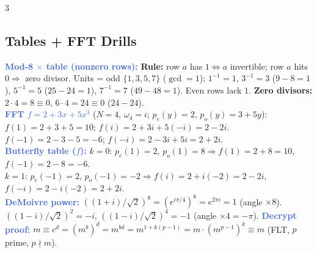 \documentclass[9pt]{extarticle}
\newcommand{\hl}[1]{\textbf{\textcolor{BrickRed}{#1}}}
\newcommand{\ex}[1]{\textbf{\textcolor{RoyalBlue}{#1}}}
\begin{document}
\begin{multicols}{3}
\subsection{Tables + FFT Drills}
\begin{sloppypar}\raggedright
\ex{Mod-8 ${\times}$ table (nonzero rows):} \hl{Rule:} row $a$ has $1\iff a$ invertible; row $a$ hits $0\Rightarrow$ zero divisor. Units = odd $\{1,3,5,7\}$ ($\gcd{=}1$); $1^{-1}{=}1$, $3^{-1}{=}3$ ($9{-}8{=}1$), $5^{-1}{=}5$ ($25{-}24{=}1$), $7^{-1}{=}7$ ($49{-}48{=}1$). Even rows lack $1$. \hl{Zero divisors:} $2{\cdot}4{=}8\equiv0$, $6{\cdot}4{=}24\equiv0$ ($24{-}24$).\\
\ex{FFT $f{=}2{+}3x{+}5x^3$} ($N{=}4$, $\omega_4{=}i$; $p_e(y){=}2$, $p_o(y){=}3{+}5y$):\\
$f(1){=}2{+}3{+}5{=}10$; $f(i){=}2{+}3i{+}5({-}i){=}2{-}2i$.\\
$f({-}1){=}2{-}3{-}5{=}{-}6$; $f({-}i){=}2{-}3i{+}5i{=}2{+}2i$.\\
\ex{Butterfly table ($f$):} $k{=}0$: $p_e(1){=}2$, $p_o(1){=}8\Rightarrow f(1){=}2{+}8{=}10$, $f({-}1){=}2{-}8{=}{-}6$.\\
$k{=}1$: $p_e({-}1){=}2$, $p_o({-}1){=}{-}2\Rightarrow f(i){=}2{+}i({-}2){=}2{-}2i$, $f({-}i){=}2{-}i({-}2){=}2{+}2i$.\\
\ex{DeMoivre power:} $((1{+}i)/\sqrt2)^8{=}(e^{i\pi/4})^8{=}e^{2\pi i}{=}1$ (angle ${\times}8$).\\
$((1{-}i)/\sqrt2)^2{=}{-}i$, $((1{-}i)/\sqrt2)^4{=}{-}1$ (angle ${\times}4{=} {-}\pi$).
\ex{Decrypt proof:} $m\equiv c^d{=}(m^b)^d{=}m^{bd}{=}m^{1{+}k(p-1)}{=}m{\cdot}(m^{p-1})^k\equiv m$ (FLT, $p$ prime, $p{\nmid}m$).
\end{sloppypar}


\end{multicols}
\end{document}
